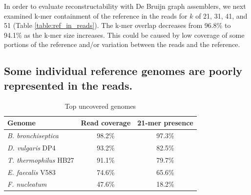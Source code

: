 \documentclass[11pt]{article}
\begin{document}
In order to evaluate reconstructability with De Bruijn graph
assemblers, we next examined k-mer containment of the reference in the
reads for $k$ of 21, 31, 41, and 51 (Table \ref{table:ref_in_reads}).
The k-mer overlap decreases from 96.8\% to 94.1\% as the k-mer size
increases. This could be caused by low coverage of some portions
of the reference and/or variation between the reads and the reference.



\subsection*{Some individual reference genomes are poorly represented in the reads.}


\begin{table}[!h]
\centering
\caption{Top uncovered genomes}
\begin{tabular}{|l|c|c|}\hline
\textbf{Genome} & \textbf {Read coverage} & \textbf{21-mer presence} \\ \hline 

{{\em B. bronchiseptica}} & 98.2\% & 97.3\% \\
\hline
{{\em D. vulgaris} DP4}  & 93.2\% & 82.5\% \\
\hline
{{\em T. thermophilus} HB27}  & 91.1\% & 79.7\% \\
\hline
{{\em E. faecalis} V583}  & 74.6\% & 65.6\% \\
\hline
{{\em F. nucleatum}}  & 47.6\% & 18.2\% \\

\hline
\end{tabular}
\label{table:genomes_uncovered-analysis}
\end{table}
\end{document}
